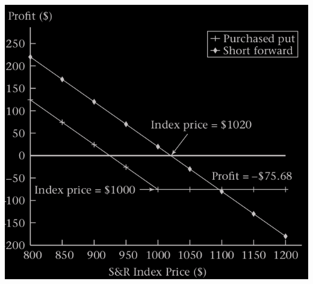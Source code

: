 \begin{frame}[fragile]
\begin{center}
	\includegraphics[scale=0.2]{figs/Figure-2-8.png}
\end{center}
\end{frame}
